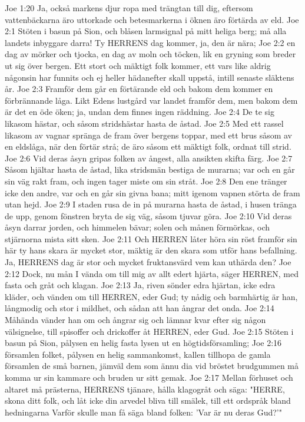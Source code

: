 Joe 1:20  Ja, också markens djur ropa med trängtan till dig, eftersom vattenbäckarna äro uttorkade och betesmarkerna i öknen äro förtärda av eld.
Joe 2:1  Stöten i basun på Sion, och blåsen larmsignal på mitt heliga berg; må alla landets inbyggare darra! Ty HERRENS dag kommer, ja, den är nära;
Joe 2:2  en dag av mörker och tjocka, en dag av moln och töcken, lik en gryning som breder ut sig över bergen. Ett stort och mäktigt folk kommer, ett vars like aldrig någonsin har funnits och ej heller hädanefter skall uppstå, intill senaste släktens år.
Joe 2:3  Framför dem går en förtärande eld och bakom dem kommer en förbrännande låga. Likt Edens lustgård var landet framför dem, men bakom dem är det en öde öken; ja, undan dem finnes ingen räddning.
Joe 2:4  De te sig likasom hästar, och såsom stridshästar hasta de åstad.
Joe 2:5  Med ett rassel likasom av vagnar spränga de fram över bergens toppar, med ett brus såsom av en eldslåga, när den förtär strå; de äro såsom ett mäktigt folk, ordnat till strid.
Joe 2:6  Vid deras åsyn gripas folken av ångest, alla ansikten skifta färg.
Joe 2:7  Såsom hjältar hasta de åstad, lika stridsmän bestiga de murarna; var och en går sin väg rakt fram, och ingen tager miste om sin stråt.
Joe 2:8  Den ene tränger icke den andre, var och en går sin givna bana; mitt igenom vapnen störta de fram utan hejd.
Joe 2:9  I staden rusa de in på murarna hasta de åstad, i husen tränga de upp, genom fönstren bryta de sig väg, såsom tjuvar göra.
Joe 2:10  Vid deras åsyn darrar jorden, och himmelen bävar; solen och månen förmörkas, och stjärnorna mista sitt sken.
Joe 2:11  Och HERREN låter höra sin röst framför sin här ty hans skara är mycket stor, mäktig är den skara som utför hans befallning. Ja, HERRENS dag är stor och mycket fruktansvärd vem kan uthärda den?
Joe 2:12  Dock, nu mån I vända om till mig av allt edert hjärta, säger HERREN, med fasta och gråt och klagan.
Joe 2:13  Ja, riven sönder edra hjärtan, icke edra kläder, och vänden om till HERREN, eder Gud; ty nådig och barmhärtig är han, långmodig och stor i mildhet, och sådan att han ångrar det onda.
Joe 2:14  Måhända vänder han om och ångrar sig och lämnar kvar efter sig någon välsignelse, till spisoffer och drickoffer åt HERREN, eder Gud.
Joe 2:15  Stöten i basun på Sion, pålysen en helig fasta lysen ut en högtidsförsamling;
Joe 2:16  församlen folket, pålysen en helig sammankomst, kallen tillhopa de gamla församlen de små barnen, jämväl dem som ännu dia vid bröstet brudgummen må komma ur sin kammare och bruden ur sitt gemak.
Joe 2:17  Mellan förhuset och altaret må prästerna, HERRENS tjänare, hålla klagogråt och säga: "HERRE, skona ditt folk, och låt icke din arvedel bliva till smälek, till ett ordspråk bland hedningarna Varför skulle man få säga bland folken: 'Var är nu deras Gud?'"
